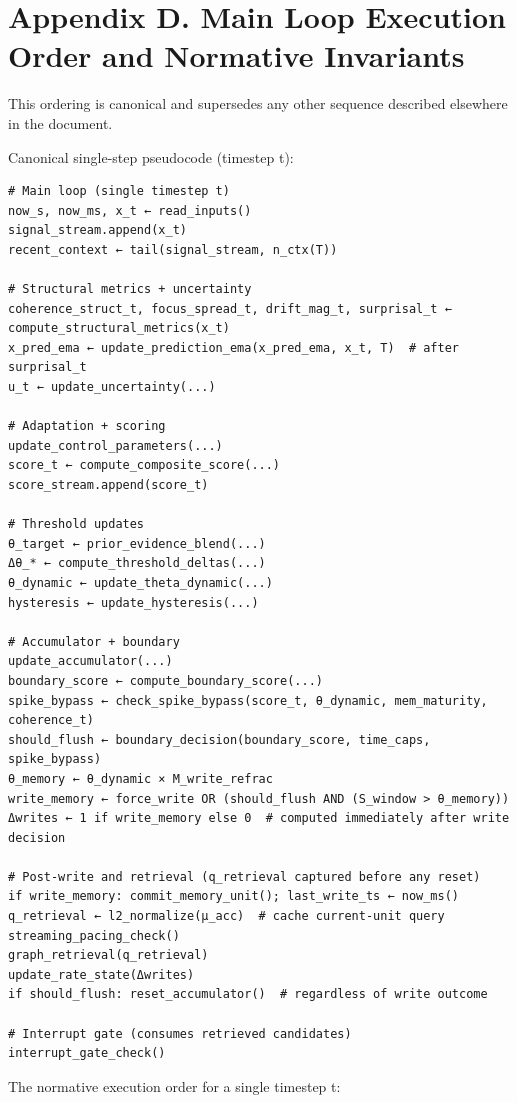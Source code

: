\documentclass[
  letterpaper,
  DIV=11,
  numbers=noendperiod]{scrartcl}
\begin{document}
\section*{Appendix D. Main Loop Execution Order and Normative
Invariants}\label{sec-app-loop}

This ordering is canonical and supersedes any other sequence described
elsewhere in the document.

Canonical single-step pseudocode (timestep t):

\begin{verbatim}
# Main loop (single timestep t)
now_s, now_ms, x_t ← read_inputs()
signal_stream.append(x_t)
recent_context ← tail(signal_stream, n_ctx(T))

# Structural metrics + uncertainty
coherence_struct_t, focus_spread_t, drift_mag_t, surprisal_t ← compute_structural_metrics(x_t)
x_pred_ema ← update_prediction_ema(x_pred_ema, x_t, T)  # after surprisal_t
u_t ← update_uncertainty(...)

# Adaptation + scoring
update_control_parameters(...)
score_t ← compute_composite_score(...)
score_stream.append(score_t)

# Threshold updates
θ_target ← prior_evidence_blend(...)
Δθ_* ← compute_threshold_deltas(...)
θ_dynamic ← update_theta_dynamic(...)
hysteresis ← update_hysteresis(...)

# Accumulator + boundary
update_accumulator(...)
boundary_score ← compute_boundary_score(...)
spike_bypass ← check_spike_bypass(score_t, θ_dynamic, mem_maturity, coherence_t)
should_flush ← boundary_decision(boundary_score, time_caps, spike_bypass)
θ_memory ← θ_dynamic × M_write_refrac
write_memory ← force_write OR (should_flush AND (S_window > θ_memory))
Δwrites ← 1 if write_memory else 0  # computed immediately after write decision

# Post-write and retrieval (q_retrieval captured before any reset)
if write_memory: commit_memory_unit(); last_write_ts ← now_ms()
q_retrieval ← l2_normalize(μ_acc)  # cache current-unit query
streaming_pacing_check()
graph_retrieval(q_retrieval)
update_rate_state(Δwrites)
if should_flush: reset_accumulator()  # regardless of write outcome

# Interrupt gate (consumes retrieved candidates)
interrupt_gate_check()
\end{verbatim}

The normative execution order for a single timestep t:
\end{document}
